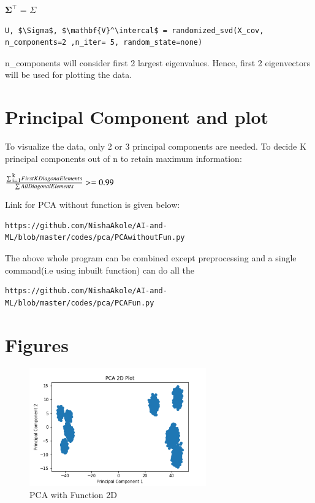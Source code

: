 \documentclass[journal,12pt,twocolumn]{IEEEtran}
\def\SPSB#1#2{\rlap{\textsuperscript{\textcolor{black}{#1}}}\SB{#2}}
\def\SB#1{\textsubscript{\textcolor{black}{#1}}}
\begin{document}
\begin{center} $\mathbf{\Sigma}^\intercal$ = $\Sigma$ \end{center} 

\begin{lstlisting}[mathescape=true]
U, $\Sigma$, $\mathbf{V}^\intercal$ = randomized_svd(X_cov, n_components=2 ,n_iter= 5, random_state=none)
\end{lstlisting}

n\_components will consider first 2 largest eigenvalues. Hence, first 2 eigenvectors will be used for plotting the data. 

\section{Principal Component and plot}
To visualize the data, only 2 or 3 principal components are needed.
To decide K principal components out of n to retain maximum information:

\begin{center}
$\frac{\sum\SPSB{k}{i=1}{First K Diagona Elements}}{\sum{All Diagonal Elements}} >= 0.99$
\end{center}

Link for PCA without function is given below:
\begin{lstlisting}[mathescape=true]
https://github.com/NishaAkole/AI-and-ML/blob/master/codes/pca/PCAwithoutFun.py
\end{lstlisting}
  
The above whole program can be combined except preprocessing and a single command(i.e using inbuilt function) can do all the  
\begin{lstlisting}[mathescape=true]
https://github.com/NishaAkole/AI-and-ML/blob/master/codes/pca/PCAFun.py
\end{lstlisting}

\section{Figures}
\begin{figure}[!h]
\begin{center}
\includegraphics[width=3in]{figs/PCA_2D.png}
\end{center}
\caption{PCA with Function 2D}
\label{fig: 2D Plot}
\end{figure}
\end{document}
